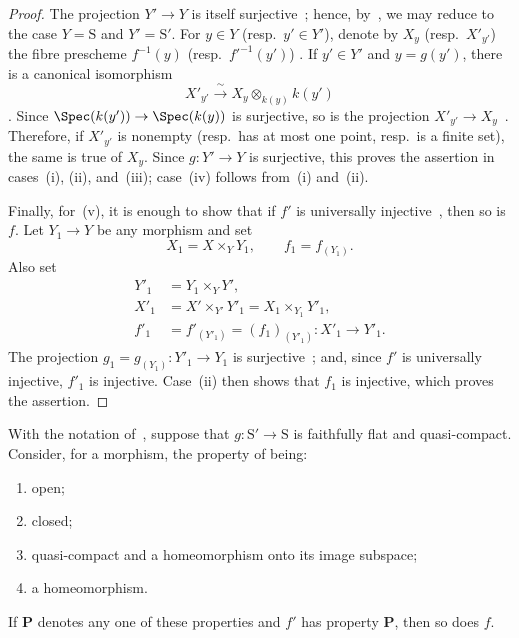 \begin{proof}
The projection $Y'\to Y$ is itself surjective~;
hence, by~, we may reduce to the case
$Y=\mathrm{S}$ and $Y'=\mathrm{S}'$. For $y\in Y$
\textnormal{(}resp.\ $y'\in Y'$\textnormal{)}, denote by $X_y$
\textnormal{(}resp.\ $X'_{y'}$\textnormal{)} the fibre prescheme
$f^{-1}(y)$ \textnormal{(}resp.\ $f'^{-1}(y')$\textnormal{)}
. If $y'\in Y'$ and $y=g(y')$, there is a canonical
isomorphism
\[
  X'_{y'}\xrightarrow{\;\sim\;}
  X_y\otimes_{k(y)}k(y')
\]
. Since
$\Spec(k(y'))\to\Spec(k(y))$ is surjective, so is the projection
$X'_{y'}\to X_y$~. Therefore, if $X'_{y'}$ is
nonempty \textnormal{(}resp.\ has at most one point, resp.\ is a finite
set\textnormal{)}, the same is true of $X_y$. Since $g:Y'\to Y$ is
surjective, this proves the assertion in cases~(i), (ii), and~(iii);
case~(iv) follows from~(i) and~(ii).

Finally, for~(v), it is enough to show that if $f'$ is universally
injective~, then so is $f$. Let $Y_1\to Y$ be any
morphism and set
\[
  X_1=X\times_Y Y_1,\qquad f_1=f_{(Y_1)}.
\]
Also set
\[
\begin{aligned}
  Y'_1&=Y_1\times_Y Y',\\
  X'_1&=X'\times_{Y'}Y'_1=X_1\times_{Y_1}Y'_1,\\
  f'_1&=f'_{(Y'_1)}=(f_1)_{(Y'_1)}:X'_1\to Y'_1.
\end{aligned}
\]
The projection $g_1=g_{(Y_1)}:Y'_1\to Y_1$ is
surjective~; and, since $f'$ is universally injective,
$f'_1$ is injective. Case~(ii) then shows that $f_1$ is injective,
which proves the assertion.
\end{proof}

\begin{proposition}[2.6.2]
\label{IV.2.6.2}
With the notation of~, suppose that
$g:\mathrm{S}'\to\mathrm{S}$ is faithfully flat and quasi-compact.
Consider, for a morphism, the property of being:
\begin{enumerate}
  \item[(i)] open;
  \item[(ii)] closed;
  \item[(iii)] quasi-compact and a homeomorphism onto its image
    subspace;
  \item[(iv)] a homeomorphism.
\end{enumerate}
If $\mathbf{P}$ denotes any one of these properties and $f'$ has
property $\mathbf{P}$, then so does $f$.
\end{proposition}

